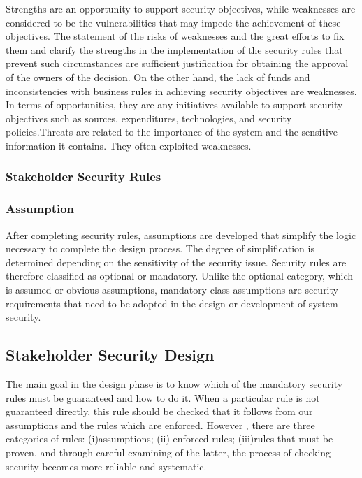 Strengths are an opportunity to support security objectives, while weaknesses are considered to be the vulnerabilities that may impede the achievement of these objectives. The statement of the risks of weaknesses and the great efforts to fix them and clarify the strengths in the implementation of the security rules that prevent such circumstances are sufficient justification for obtaining the approval of the owners of the decision. On the other hand, the lack of funds and inconsistencies with business rules in achieving security objectives are weaknesses. In terms of opportunities, they are any initiatives available to support security objectives such as sources, expenditures, technologies, and security policies.Threats are related to the importance of the system and the sensitive information it contains. They often exploited weaknesses.

\subsubsection{Stakeholder Security Rules}\label{stsecrul}
\subsubsection{Assumption}\label{assmp} 
After completing security rules, assumptions are developed that simplify the logic necessary to complete the design process. The degree of simplification is determined depending on the sensitivity of the security issue. Security rules are therefore classified as optional or mandatory. Unlike the optional category, which is assumed or obvious assumptions, mandatory class assumptions are security requirements that need to be adopted in the design or development of system security.
\subsection{Stakeholder Security Design}\label{stsecdsgn} 
The main goal in the design phase is to know which of the mandatory security rules must be guaranteed and how to do it. When a particular  rule is not guaranteed directly,  this rule should be checked  that it follows from our assumptions and the rules which are enforced. However , there are three categories of rules: (i)assumptions; (ii) enforced rules; (iii)rules that must be proven, and through careful examining of the latter, the process of checking security becomes more reliable and systematic.

